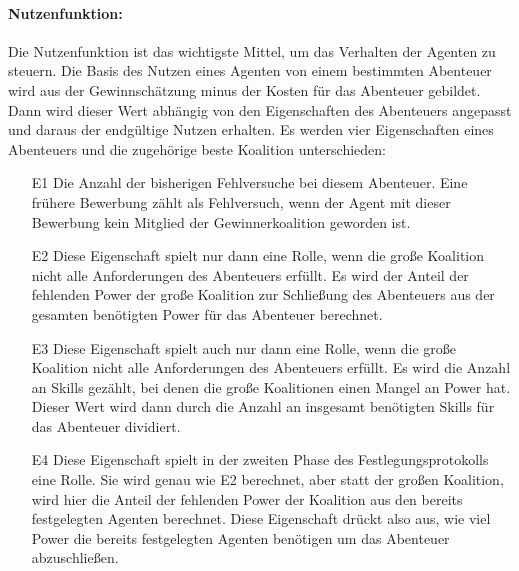 \documentclass[fleqn,10pt]{SelfArx} %
\begin{document}
\paragraph{Nutzenfunktion:}
Die Nutzenfunktion ist das wichtigste Mittel, um das Verhalten der Agenten zu steuern. Die Basis des Nutzen eines Agenten von einem bestimmten Abenteuer wird aus der Gewinnschätzung minus der Kosten für das Abenteuer gebildet. Dann wird dieser Wert abhängig von den Eigenschaften des Abenteuers angepasst und daraus der endgültige Nutzen erhalten. Es werden vier Eigenschaften eines Abenteuers und die zugehörige beste Koalition unterschieden:
\begin{itemize}
  \item[E1] Die Anzahl der bisherigen Fehlversuche bei diesem Abenteuer. Eine frühere Bewerbung zählt als Fehlversuch, wenn der Agent mit dieser Bewerbung kein Mitglied der Gewinnerkoalition geworden ist.
  \item[E2] Diese Eigenschaft spielt nur dann eine Rolle, wenn die große Koalition nicht alle Anforderungen des Abenteuers erfüllt. Es wird der Anteil der fehlenden Power der große Koalition zur Schließung des Abenteuers aus der gesamten benötigten Power für das Abenteuer berechnet. 
  \item[E3] Diese Eigenschaft spielt auch nur dann eine Rolle, wenn die große Koalition nicht alle Anforderungen des Abenteuers erfüllt. Es wird die Anzahl an Skills gezählt, bei denen die große Koalitionen einen Mangel an Power hat. Dieser Wert wird dann durch die Anzahl an insgesamt benötigten Skills für das Abenteuer dividiert.
  \item[E4] Diese Eigenschaft spielt in der zweiten Phase des Festlegungsprotokolls eine Rolle. Sie wird genau wie E2 berechnet, aber statt der großen Koalition, wird hier die Anteil der fehlenden Power der Koalition aus den bereits festgelegten Agenten berechnet. Diese Eigenschaft drückt also aus, wie viel Power die bereits festgelegten Agenten benötigen um das Abenteuer abzuschließen. 
\end{itemize}
\end{document}
